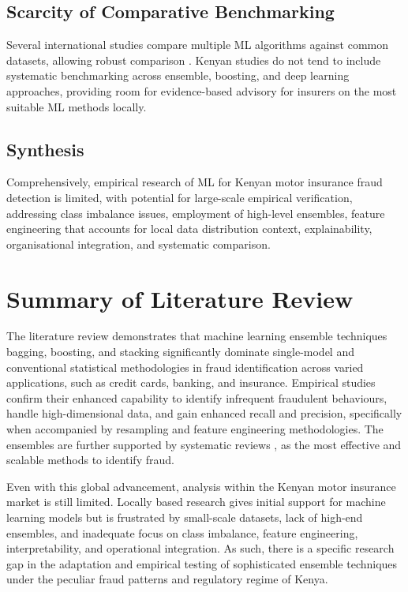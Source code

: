 \documentclass[12pt,a4paper,oneside]{report}
\numberwithin{equation}{chapter}
\begin{document}
\subsection{Scarcity of Comparative Benchmarking}

Several international studies compare multiple ML algorithms against common datasets, allowing
robust comparison \cite{ashtiani2021intelligent,zhang2024fraud}. Kenyan studies do not tend to
include systematic benchmarking across ensemble, boosting, and deep learning approaches, providing
room for evidence-based advisory for insurers on the most suitable ML methods locally.

\subsection{Synthesis}

Comprehensively, empirical research of ML for Kenyan motor insurance fraud detection is limited,
with potential for large-scale empirical verification, addressing class imbalance issues, employment
of high-level ensembles, feature engineering that accounts for local data distribution context,
explainability, organisational integration, and systematic comparison.

\section{Summary of Literature Review}

The literature review demonstrates that machine learning ensemble techniques bagging, boosting,
and stacking significantly dominate single-model and conventional statistical methodologies
in fraud identification across varied applications, such as credit cards, banking, and insurance.
Empirical studies confirm their enhanced capability to identify infrequent fraudulent behaviours,
handle high-dimensional data, and gain enhanced recall and precision, specifically when accompanied
by resampling and feature engineering methodologies. The ensembles are further supported by
systematic reviews \cite{ashtiani2021intelligent}, as the most effective and scalable methods to identify fraud.

Even with this global advancement, analysis within the Kenyan motor insurance market is still
limited. Locally based research \cite{njeru2022detection} gives initial support for machine
learning models but is frustrated by small-scale datasets, lack of high-end ensembles, and
inadequate focus on class imbalance, feature engineering, interpretability, and operational
integration. As such, there is a specific research gap in the adaptation and empirical testing of
sophisticated ensemble techniques under the peculiar fraud patterns and regulatory regime of Kenya.
\end{document}
